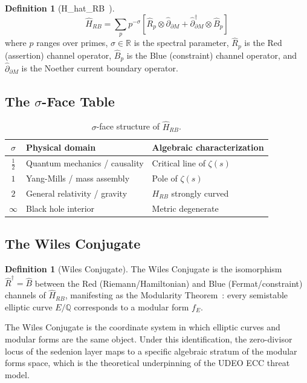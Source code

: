 \documentclass[runningheads]{llncs}
\theoremstyle{plain}
\theoremstyle{definition}
\newtheorem{definition}[theorem]{Definition}
\begin{document}
\begin{definition}[H\_hat\_RB~\cite{Allison2026}]
\[
\hat{H}_{RB} = \sum_p p^{-\sigma}
\left[\hat{R}_p \otimes \hat{\partial}_{\partial M} +
\hat{\partial}_{\partial M}^\dagger \otimes \hat{B}_p\right]
\]
where $p$ ranges over primes, $\sigma \in \mathbb{R}$ is the spectral parameter,
$\hat{R}_p$ is the Red (assertion) channel operator, $\hat{B}_p$ is the Blue
(constraint) channel operator, and $\hat{\partial}_{\partial M}$ is the Noether
current boundary operator.
\end{definition}

\subsection{The $\sigma$-Face Table}

\begin{table}[h]
\centering
\caption{$\sigma$-face structure of $\hat{H}_{RB}$.}
\label{tab:sigma}
\begin{tabular}{cll}
\toprule
$\sigma$ & Physical domain & Algebraic characterization \\
\midrule
$\frac{1}{2}$ & Quantum mechanics / causality & Critical line of $\zeta(s)$ \\
$1$ & Yang-Mills / mass assembly & Pole of $\zeta(s)$ \\
$2$ & General relativity / gravity & $H_{RB}$ strongly curved \\
$\infty$ & Black hole interior & Metric degenerate \\
\bottomrule
\end{tabular}
\end{table}

\subsection{The Wiles Conjugate}

\begin{definition}[Wiles Conjugate]
\label{def:wiles}
The Wiles Conjugate is the isomorphism
$\hat{R}^\dagger = \hat{B}$ between the Red (Riemann/Hamiltonian) and
Blue (Fermat/constraint) channels of $\hat{H}_{RB}$, manifesting as
the Modularity Theorem~\cite{Wiles1995,TaylorWiles1995}:
every semistable elliptic curve $E/\mathbb{Q}$ corresponds to a modular form $f_E$.
\end{definition}

The Wiles Conjugate is the coordinate system in which elliptic curves and
modular forms are the same object. Under this identification, the
zero-divisor locus of the sedenion layer maps to a specific algebraic
stratum of the modular forms space, which is the theoretical underpinning
of the UDEO ECC threat model.
\end{document}
